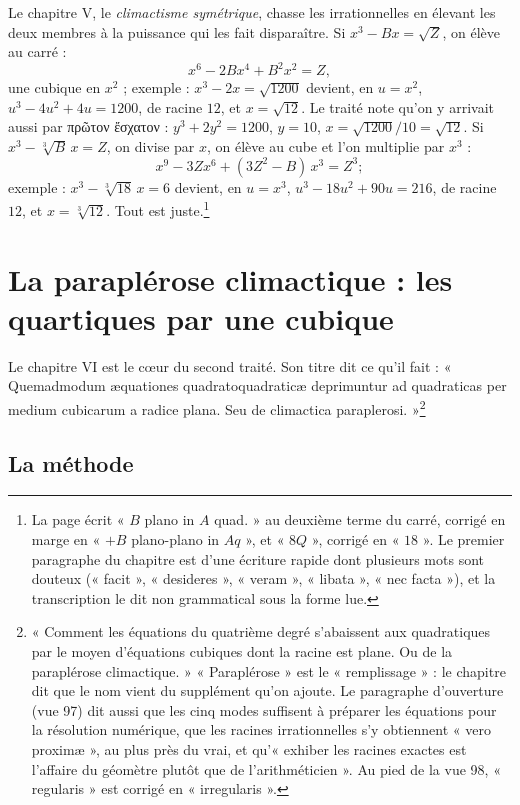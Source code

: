 \documentclass[11pt,a4paper]{article}
\begin{document}
Le chapitre V, le \emph{climactisme symétrique}, chasse les irrationnelles en
élevant les deux membres à la puissance qui les fait disparaître. Si
$x^3 - Bx = \sqrt{Z}$, on élève au carré :
\[ x^6 - 2Bx^4 + B^2x^2 = Z , \]
une cubique en $x^2$ ; exemple : $x^3 - 2x = \sqrt{1200}$ devient, en $u = x^2$,
$u^3 - 4u^2 + 4u = 1200$, de racine $12$, et $x = \sqrt{12}$. Le traité note qu'on
y arrivait aussi par πρῶτον ἔσχατον : $y^3 + 2y^2 = 1200$, $y = 10$,
$x = \sqrt{1200}/10 = \sqrt{12}$. Si $x^3 - \sqrt[3]{B}\,x = Z$, on divise par $x$,
on élève au cube et l'on multiplie par $x^3$ :
\[ x^9 - 3Zx^6 + (3Z^2 - B)\,x^3 = Z^3 ; \]
exemple : $x^3 - \sqrt[3]{18}\,x = 6$ devient, en $u = x^3$,
$u^3 - 18u^2 + 90u = 216$, de racine $12$, et $x = \sqrt[3]{12}$. Tout est
juste.\footnote{La page écrit « $B$ plano in $A$ quad. » au deuxième terme du carré,
corrigé en marge en « $+ B$ plano-plano in $Aq$ », et « $8Q$ », corrigé en « $18$ ».
Le premier paragraphe du chapitre est d'une écriture rapide dont plusieurs mots
sont douteux (« facit », « desideres », « veram », « libata », « nec facta »), et
la transcription le dit non grammatical sous la forme lue.}

\section*{La paraplérose climactique : les quartiques par une cubique}

Le chapitre VI est le cœur du second traité. Son titre dit ce qu'il fait :
« Quemadmodum æquationes quadratoquadraticæ deprimuntur ad quadraticas per
medium cubicarum a radice plana. Seu de climactica paraplerosi. »\footnote{« Comment
les équations du quatrième degré s'abaissent aux quadratiques par le moyen
d'équations cubiques dont la racine est plane. Ou de la paraplérose
climactique. » « Paraplérose » est le « remplissage » : le chapitre dit que le nom
vient du supplément qu'on ajoute. Le paragraphe d'ouverture (vue 97) dit aussi
que les cinq modes suffisent à préparer les équations pour la résolution
numérique, que les racines irrationnelles s'y obtiennent « vero proximæ », au
plus près du vrai, et qu'« exhiber les racines exactes est l'affaire du géomètre
plutôt que de l'arithméticien ». Au pied de la vue 98, « regularis » est corrigé
en « irregularis ».}

\subsection*{La méthode}
\end{document}
